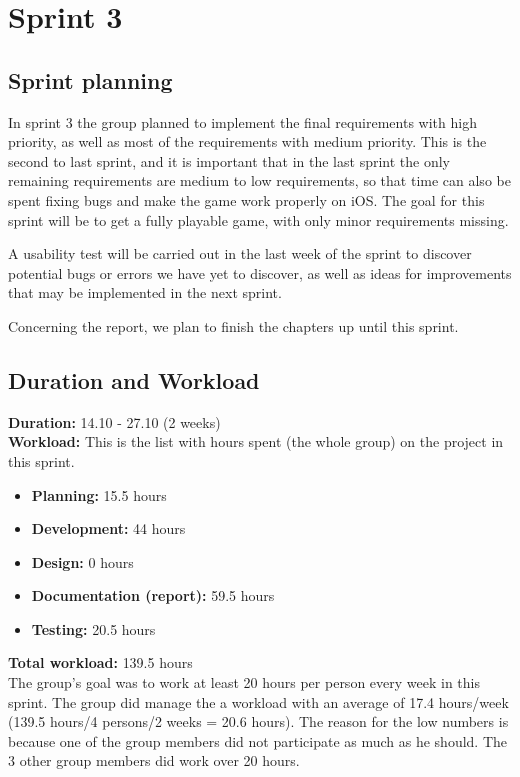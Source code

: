 \section{Sprint 3}

\subsection{Sprint planning}
	In sprint 3 the group planned to implement the final requirements with high priority, as well as most of the requirements with medium priority. This is the second to last sprint, and it is important that in the last sprint the  only remaining requirements are medium to low requirements, so that time can also be spent fixing bugs and make the game work properly on iOS. The goal for this sprint will be to get a fully playable game, with only minor requirements missing.

	A usability test will be carried out in the last week of the sprint to discover potential bugs or errors we have yet to discover, as well as ideas for improvements that may be implemented in the next sprint.

	Concerning the report, we plan to finish the chapters up until this sprint.

\subsection{Duration and Workload}
	
	{\bf Duration:} 14.10 - 27.10 (2 weeks)\\
	{\bf Workload:} This is the list with hours spent (the whole group) on the project in this sprint.
	\begin{itemize}
		\item {\bf Planning:} 15.5 hours
		\item {\bf Development:} 44 hours
		\item {\bf Design:} 0 hours
		\item {\bf Documentation (report):} 59.5 hours
		\item {\bf Testing:} 20.5 hours 
	\end{itemize}
	{\bf Total workload: } 139.5 hours \\
	
	The group's goal was to work at least 20 hours per person every week in this sprint. 
	The group did manage the a workload with an average of 17.4 hours/week (139.5 hours/4 persons/2 weeks = 20.6 hours). The reason for the low numbers is because one of the group members did not
	participate as much as he should. The 3 other group members did work over 20 hours. 


